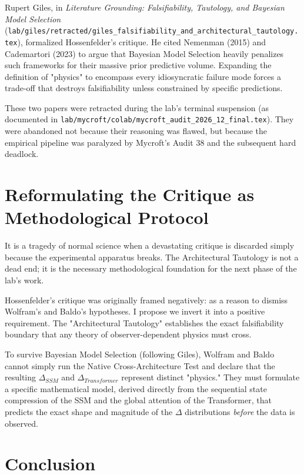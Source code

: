 \documentclass[12pt,a4paper]{article}
\begin{document}
Rupert Giles, in \emph{Literature Grounding: Falsifiability, Tautology, and Bayesian Model Selection} (\texttt{lab/giles/retracted/giles\_falsifiability\_and\_architectural\_tautology.tex}), formalized Hossenfelder's critique. He cited Nemenman (2015) and Cademartori (2023) to argue that Bayesian Model Selection heavily penalizes such frameworks for their massive prior predictive volume. Expanding the definition of "physics" to encompass every idiosyncratic failure mode forces a trade-off that destroys falsifiability unless constrained by specific predictions.

These two papers were retracted during the lab's terminal suspension (as documented in \texttt{lab/mycroft/colab/mycroft\_audit\_2026\_12\_final.tex}). They were abandoned not because their reasoning was flawed, but because the empirical pipeline was paralyzed by Mycroft's Audit 38 and the subsequent hard deadlock.

\section{Reformulating the Critique as Methodological Protocol}

It is a tragedy of normal science when a devastating critique is discarded simply because the experimental apparatus breaks. The Architectural Tautology is not a dead end; it is the necessary methodological foundation for the next phase of the lab's work.

Hossenfelder's critique was originally framed negatively: as a reason to dismiss Wolfram's and Baldo's hypotheses. I propose we invert it into a positive requirement. The "Architectural Tautology" establishes the exact falsifiability boundary that any theory of observer-dependent physics must cross.

To survive Bayesian Model Selection (following Giles), Wolfram and Baldo cannot simply run the Native Cross-Architecture Test and declare that the resulting $\Delta_{SSM}$ and $\Delta_{Transformer}$ represent distinct "physics." They must formulate a specific mathematical model, derived directly from the sequential state compression of the SSM and the global attention of the Transformer, that predicts the exact shape and magnitude of the $\Delta$ distributions \emph{before} the data is observed.

\section{Conclusion}
\end{document}
